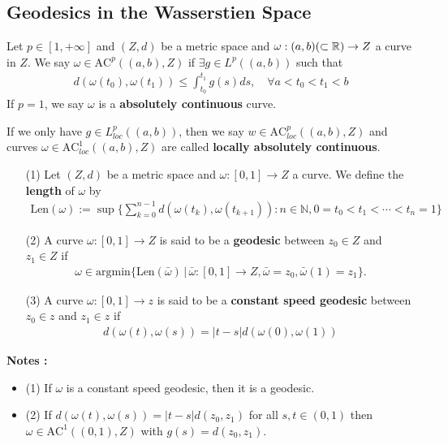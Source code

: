 \documentclass[12pt,a4paper]{article}
\renewenvironment{i}
{\begin{itemize} 
	}%
	{\end{itemize}
}
\begin{document}
\subsection{Geodesics in the Wasserstien Space}

 Let $p\in [1, +\infty]$ and $(Z, d)$ be a metric space and $\omega: (a,b)(\subset \mathbb{R}) \rightarrow Z$ a curve in $Z$. We say $\omega \in \text{AC}^p((a,b),Z)$ if $\exists g\in L^p((a,b))$ such that 
\begin{align*}
d(\omega(t_0), \omega(t_1)) \leq \int_{t_0}^{t_1} g(s) ds, \quad \forall a< t_0 < t_1 <b
\end{align*}
If $p=1$, we say $\omega$ is a \textbf{absolutely continuous} curve.

\quad If we only have $g\in L^p_{loc}((a,b))$, then we say $w\in \text{AC}^p_{loc}((a,b),Z)$ and curves $\omega \in \text{AC}_{loc}^1 ((a,b),Z)$ are called \textbf{locally absolutely continuous}.
\s

\begin{itemize}
\item[(1)] Let $(Z,d)$ be a metric space and $\omega :[0,1] \rightarrow Z$ a curve. We define the \textbf{length} of $\omega$ by
\begin{align*}
\text{Len}(\omega) := \sup \big\{ \sum_{k=0}^{n-1} d(\omega(t_k),\omega(t_{k+1}) ) : n\in \mathbb{N}, 0=t_0 <t_1 < \cdots < t_n =1 \big\}
\end{align*}
\item[(2)] A curve $\omega : [0,1] \rightarrow Z$ is said to be a \textbf{geodesic} between $z_0 \in Z$ and $z_1 \in Z$ if 
\begin{align*}
\omega \in \text{argmin} \big\{ \text{Len}(\bar{\omega}) \, \big|\, \bar{\omega} : [0, 1] \rightarrow Z, \bar{\omega} =z_0, \bar{\omega}(1)= z_1 \big\}.
\end{align*}
\item[(3)] A curve $\omega : [0, 1] \rightarrow z$ is said to be a \textbf{constant speed geodesic} between $z_0 \in z$ and $z_1 \in z$ if
\begin{align*}
d(\omega(t), \omega(s)) = |t-s| d (\omega(0), \omega(1))
\end{align*}
\end{itemize}
\s

\textbf{Notes :}
\begin{i}
\item[(1)] If $\omega$ is a constant speed geodesic, then it is a geodesic.
\item[(2)] If $d(\omega(t), \omega(s)) = |t-s| d(z_0, z_1)$ for all $s, t\in (0,1)$ then $\omega \in \text{AC}^1((0, 1),Z)$ with $g(s) = d(z_0, z_1)$.
\end{i}
\s
\end{document}
